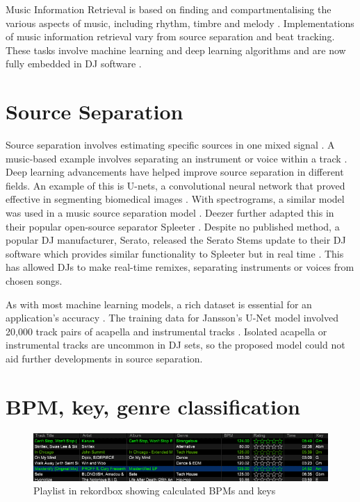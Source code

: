 Music Information Retrieval is based on finding and compartmentalising the various aspects of music, including rhythm, timbre and melody \citep{orio_music_2006}. Implementations of music information retrieval vary from source separation and beat tracking. These tasks involve machine learning and deep learning algorithms and are now fully embedded in DJ software \citep{rekordbox_rekordbox_2020}. 

\section{Source Separation}

Source separation involves estimating specific sources in one mixed signal \citep{jansson_singing_2017}. A music-based example involves separating an instrument or voice within a track \citep{sgouros_efficient_2022}. Deep learning advancements have helped improve source separation in different fields. An example of this is U-nets, a convolutional neural network that proved effective in segmenting biomedical images \citep{ronneberger_u-net_2015}. With spectrograms, a similar model was used in a music source separation model \citep{jansson_singing_2017}. Deezer further adapted this in their popular open-source separator Spleeter \citep{hennequin_spleeter_2020}. Despite no published method, a popular DJ manufacturer, Serato, released the Serato Stems update to their DJ software which provides similar functionality to Spleeter but in real time \citep{kirn_review_2023}. This has allowed DJs to make real-time remixes, separating instruments or voices from chosen songs.

As with most machine learning models, a rich dataset is essential for an application's accuracy \citep{jain_overview_2020}. The training data for Jansson's U-Net model involved 20,000 track pairs of acapella and instrumental tracks \citep{jansson_singing_2017}. Isolated acapella or instrumental tracks are uncommon in DJ sets, so the proposed model could not aid further developments in source separation.


\section{BPM, key, genre classification}

\begin{figure}[H]
	
	\includegraphics[scale=0.64]{images/rekordbox}
	\centering
	\caption{Playlist in rekordbox showing calculated BPMs and keys \citep{rekordbox_rekordbox_2023}} 
\end{figure}


